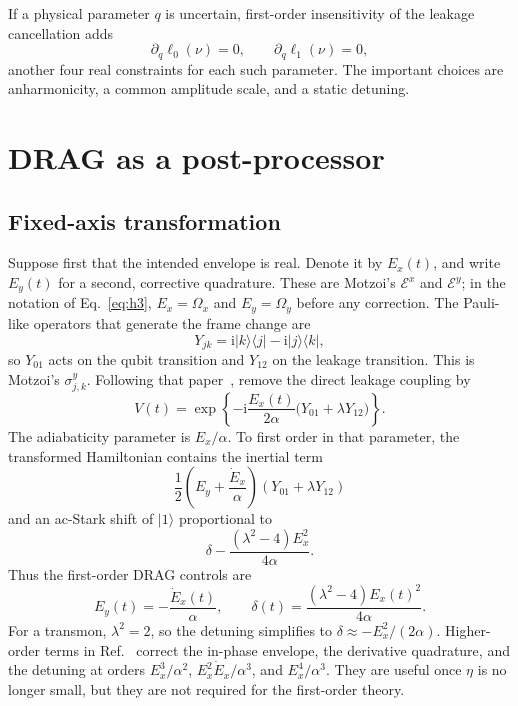 \documentclass[11pt,a4paper]{article}
\theoremstyle{definition}
\newcommand{\ket}[1]{\lvert #1\rangle}
\newcommand{\bra}[1]{\langle #1\rvert}
\newcommand{\ii}{\mathrm{i}}
\begin{document}
If a physical parameter \(q\) is uncertain, first-order insensitivity of the
leakage cancellation adds
\begin{equation}
  \partial_q\ell_0(\nu)=0,\qquad \partial_q\ell_1(\nu)=0,
\end{equation}
another four real constraints for each such parameter.  The important choices
are anharmonicity, a common amplitude scale, and a static detuning.

\section{DRAG as a post-processor}
\label{sec:drag}

\subsection{Fixed-axis transformation}

Suppose first that the intended envelope is real.  Denote it by \(E_x(t)\),
and write \(E_y(t)\) for a second, corrective quadrature.  These are Motzoi's
\(\mathcal{E}^x\) and \(\mathcal{E}^y\); in the notation of
Eq.~\eqref{eq:h3}, \(E_x=\Omega_x\) and \(E_y=\Omega_y\) before any correction.
The Pauli-like operators that generate the frame change are
\begin{equation}
  Y_{jk}=\ii\ket{k}\bra{j}-\ii\ket{j}\bra{k},
\end{equation}
so \(Y_{01}\) acts on the qubit transition and \(Y_{12}\) on the leakage
transition.  This is Motzoi's \(\sigma^y_{j,k}\).  Following that
paper~\cite{Motzoi2009}, remove the direct leakage coupling by
\begin{equation}
\label{eq:V}
  V(t)=\exp\left\{-\ii\frac{E_x(t)}{2\alpha}
    \bigl(Y_{01}+\lambda Y_{12}\bigr)\right\}.
\end{equation}
The adiabaticity parameter is \(E_x/\alpha\).  To first order in that
parameter, the transformed Hamiltonian contains the inertial term
\begin{equation}
  \frac12\left(E_y+\frac{\dot E_x}{\alpha}\right)(Y_{01}+\lambda Y_{12})
\end{equation}
and an ac-Stark shift of \(\ket1\) proportional to
\begin{equation}
  \delta-\frac{(\lambda^2-4)E_x^2}{4\alpha}.
\end{equation}
Thus the first-order DRAG controls are
\begin{equation}
\label{eq:drag-fixed}
  E_y(t)=-\frac{\dot E_x(t)}{\alpha},
  \qquad
  \delta(t)=\frac{(\lambda^2-4)E_x(t)^2}{4\alpha}.
\end{equation}
For a transmon, \(\lambda^2=2\), so the detuning simplifies to
\(\delta\approx -E_x^2/(2\alpha)\).  Higher-order terms in
Ref.~\cite{Motzoi2009} correct the in-phase envelope, the derivative
quadrature, and the detuning at orders \(E_x^3/\alpha^2\), \(E_x^2\dot
E_x/\alpha^3\), and \(E_x^4/\alpha^3\).  They are useful once \(\eta\) is no
longer small, but they are not required for the first-order theory.
\end{document}
